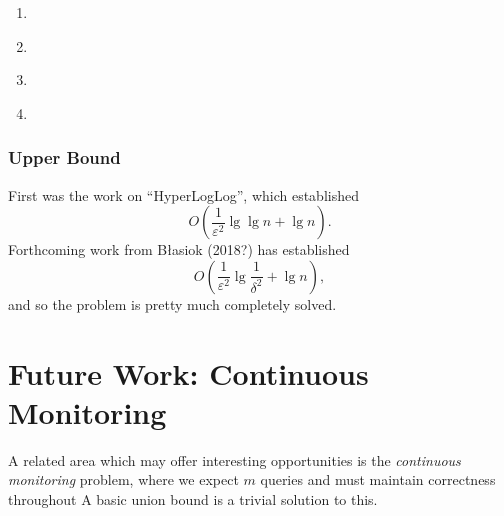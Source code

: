 \documentclass[11pt]{article}
\newcommand{\eps}{\varepsilon}
\begin{document}
\begin{enumerate}
\item \cite{alon1996space}
\item \cite{woodruff2004optimal}
\item \cite{indyk2005optimal}
\item \cite{jayram2009data}
\end{enumerate}

\subsubsection{Upper Bound} First was the work on ``HyperLogLog'', which established $$O\left(\frac{1}{\eps^2} \lg\lg n + \lg n\right).$$ Forthcoming work from B{\l}asiok (2018?) has established $$O\left(\frac{1}{\eps^2} \lg\frac{1}{\delta^2} + \lg n\right),$$ and so the problem is pretty much completely solved.

\section{Future Work: Continuous Monitoring}

A related area which may offer interesting opportunities is the \emph{continuous monitoring} problem, where we expect $m$ queries and must maintain correctness throughout A basic union bound is a trivial solution to this.


\end{document}
